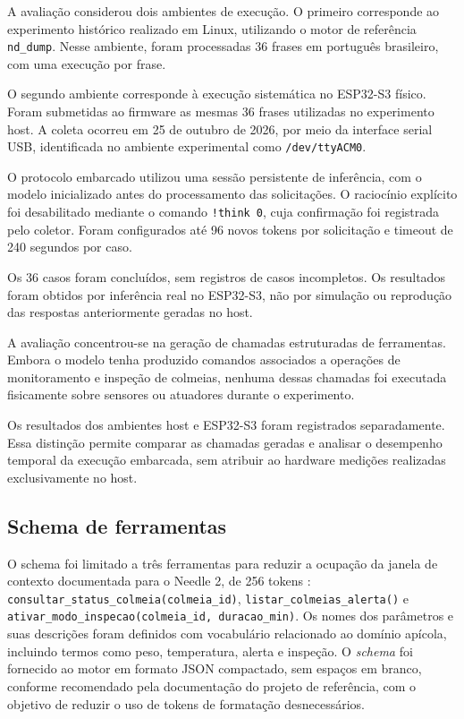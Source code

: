 \documentclass[12pt]{article}
\begin{document}
A avaliação considerou dois ambientes de execução.
O primeiro corresponde ao experimento histórico realizado
em Linux, utilizando o motor de referência
\texttt{nd\_dump}. Nesse ambiente, foram processadas
36 frases em português brasileiro, com uma execução
por frase.

O segundo ambiente corresponde à execução sistemática
no ESP32-S3 físico. Foram submetidas ao firmware as
mesmas 36 frases utilizadas no experimento host.
A coleta ocorreu em 25 de outubro de 2026, por meio
da interface serial USB, identificada no ambiente
experimental como \texttt{/dev/ttyACM0}.

O protocolo embarcado utilizou uma sessão persistente
de inferência, com o modelo inicializado antes do
processamento das solicitações. O raciocínio explícito
foi desabilitado mediante o comando \texttt{!think 0},
cuja confirmação foi registrada pelo coletor.
Foram configurados até 96 novos tokens por solicitação
e timeout de 240 segundos por caso.

Os 36 casos foram concluídos, sem registros de casos
incompletos. Os resultados foram obtidos por inferência
real no ESP32-S3, não por simulação ou reprodução
das respostas anteriormente geradas no host.

A avaliação concentrou-se na geração de chamadas
estruturadas de ferramentas. Embora o modelo tenha
produzido comandos associados a operações de
monitoramento e inspeção de colmeias, nenhuma dessas
chamadas foi executada fisicamente sobre sensores
ou atuadores durante o experimento.

Os resultados dos ambientes host e ESP32-S3 foram
registrados separadamente. Essa distinção permite
comparar as chamadas geradas e analisar o desempenho
temporal da execução embarcada, sem atribuir ao
hardware medições realizadas exclusivamente no host.

\subsection{Schema de ferramentas}

O schema foi limitado a três ferramentas para reduzir a ocupação da
janela de contexto documentada para o Needle 2, de 256 tokens
\cite{cactusneedle2repo}:
\texttt{consultar\_status\_colmeia(colmeia\_id)},
\texttt{listar\_colmeias\_alerta()} e
\texttt{ativar\_modo\_inspecao(colmeia\_id, duracao\_min)}. Os nomes dos parâmetros e suas descrições foram definidos com vocabulário
relacionado ao domínio apícola, incluindo termos como peso, temperatura,
alerta e inspeção. O \textit{schema} foi fornecido ao motor em formato
JSON compactado, sem espaços em branco, conforme recomendado pela
documentação do projeto de referência, com o objetivo de reduzir o uso de
tokens de formatação desnecessários.
\end{document}
